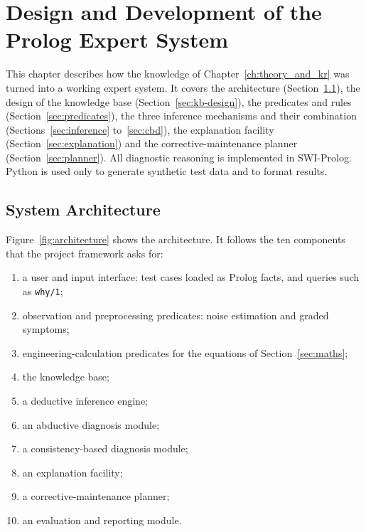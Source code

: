 \chapter{Design and Development of the Prolog Expert System}
\label{ch:design_and_development}

This chapter describes how the knowledge of Chapter~\ref{ch:theory_and_kr} was turned into a working expert system. It covers the architecture (Section~\ref{sec:architecture}), the design of the knowledge base (Section~\ref{sec:kb-design}), the predicates and rules (Section~\ref{sec:predicates}), the three inference mechanisms and their combination (Sections~\ref{sec:inference} to~\ref{sec:cbd}), the explanation facility (Section~\ref{sec:explanation}) and the corrective-maintenance planner (Section~\ref{sec:planner}). All diagnostic reasoning is implemented in SWI-Prolog. Python is used only to generate synthetic test data and to format results.


\section{System Architecture}
\label{sec:architecture}

Figure~\ref{fig:architecture} shows the architecture. It follows the ten components that the project framework asks for:

\begin{enumerate}
  \item a user and input interface: test cases loaded as Prolog facts, and queries such as \texttt{why/1};
  \item observation and preprocessing predicates: noise estimation and graded symptoms;
  \item engineering-calculation predicates for the equations of Section~\ref{sec:maths};
  \item the knowledge base;
  \item a deductive inference engine;
  \item an abductive diagnosis module;
  \item a consistency-based diagnosis module;
  \item an explanation facility;
  \item a corrective-maintenance planner;
  \item an evaluation and reporting module.
\end{enumerate}

